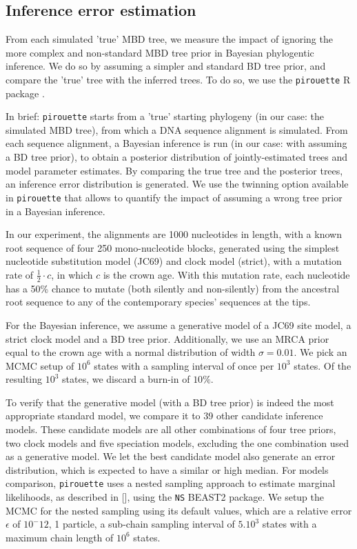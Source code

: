 \subsection{Inference error estimation}

From each simulated 'true' MBD tree, we measure the impact of
ignoring the more complex and non-standard MBD tree prior in
Bayesian phylogentic inference.
We do so by assuming a simpler and standard BD tree prior,
and compare the 'true' tree with the inferred trees.
To do so, we use the \verb;pirouette; R package \citep{pirouette}.

In brief: \verb;pirouette; starts from 
a 'true' starting phylogeny (in our case: the simulated MBD tree), 
from which a DNA sequence alignment is simulated. 
From each sequence alignment, a Bayesian 
inference is run (in our case: with assuming a BD tree prior), 
to obtain a posterior distribution of jointly-estimated trees and model parameter estimates.
By comparing the true tree and the posterior trees, 
an inference error distribution is generated.
We use the twinning option available in \verb;pirouette;
that allows to quantify the impact of assuming a wrong
tree prior in a Bayesian inference.

In our experiment, the alignments are 1000 nucleotides in length, 
with a known root sequence of four 250 mono-nucleotide blocks, 
generated using the simplest nucleotide substitution model (JC69) 
and clock model (strict), with a mutation rate of $\frac{1}{2}\cdot c$,
in which $c$ is the crown age. 
With this mutation rate, each nucleotide has a 50\% chance
to mutate (both silently and non-silently) from the ancestral root sequence 
to any of the contemporary species' sequences at the tips.

For the Bayesian inference, we assume a generative model of 
a JC69 site model, a strict clock model and a BD tree prior. 
Additionally, we use an MRCA prior equal to the crown age with a normal distribution 
of width $\sigma = 0.01$. We pick an MCMC setup of $10^6$ states
with a sampling interval of once per $10^3$ states. Of the resulting
$10^3$ states, we discard a burn-in of $10\%$.

To verify that the generative model (with a BD tree prior) is
indeed the most appropriate standard model, we compare it to
39 other candidate inference models. These candidate models 
are all other combinations of four tree priors, 
two clock models and five speciation models, 
excluding the one combination used as a generative model.
We let the best candidate model also generate an error distribution,
which is expected to have a similar or high median.
For models comparison, \verb;pirouette; uses a nested sampling approach
to estimate marginal likelihoods,
as described in [\cite{maturana2018model}], 
using the \verb;NS; BEAST2 package. We setup the MCMC for the nested sampling
using its default values, which are a relative error $\epsilon$ of $10^-12$, 
1 particle, a sub-chain sampling interval of $5.10^3$ states with
a maximum chain length of $10^6$ states.

